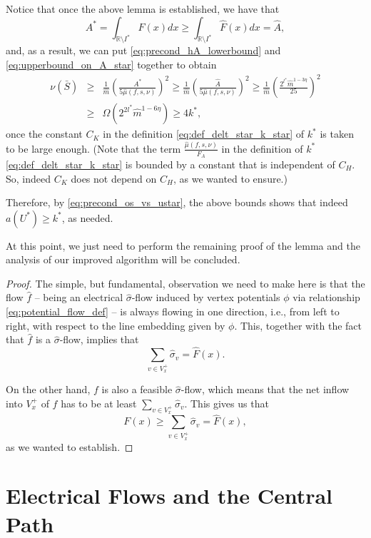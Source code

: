\documentclass[11pt, letterpaper]{article}
\newcommand{\cheavy}{C_{H}}
\newcommand{\ckstar}{C_{K}}
\newcommand{\fauxiliary}{F_{A}}
\newcommand{\bbR}{\mathbb{R}}
\newcommand{\hA}{\widehat{A}}
\newcommand{\hF}{\widehat{F}}
\newcommand{\hm}{\widehat{m}}
\newcommand{\oS}{\bar{S}}
\newcommand{\hmu}{\hat{\mu}}
\newcommand{\hsigma}{\hat{\sigma}}
\newcommand{\vphi}{\boldsymbol{\mathit{\phi}}}
\newcommand{\vnu}{\boldsymbol{\mathit{\nu}}}
\newcommand{\hvsigma}{\boldsymbol{\mathit{\hat{\sigma}}}}
\renewcommand{\aa}{\boldsymbol{\mathit{a}}}
\newcommand{\ff}{\boldsymbol{\mathit{f}}}
\newcommand{\hff}{\boldsymbol{\mathit{\hat{f}}}}
\renewcommand{\ss}{\boldsymbol{\mathit{s}}}
\begin{document}
Notice that once the above lemma is established, we have that 
\[
A^*=\int_{\bbR\setminus I^*} F(x) dx\geq \int_{\bbR\setminus I^*} \hF(x) dx = \hA,
\]
and, as a result, we can put \eqref{eq:precond_hA_lowerbound} and \eqref{eq:upperbound_on_A_star} together to obtain
\begin{eqnarray*}
\vnu(\oS) &\geq& \frac{1}{\hm}\left( \frac{A^*}{5\hmu(\ff,\ss,\vnu)}\right)^2 \geq  \frac{1}{\hm}\left( \frac{\hA}{5\hmu(\ff,\ss,\vnu)}\right)^2\geq \frac{1}{\hm}\left( \frac{2^{l^*}\hm^{1-3\eta}}{25}\right)^2\\
& \geq & \Omega(2^{2l^*} \hm^{1-6\eta}) \geq 4k^*, 
\end{eqnarray*}
once the constant $\ckstar$ in the definition \eqref{eq:def_delt_star_k_star} of $k^*$ is taken to be large enough. (Note that the term $\frac{\hmu(\ff,\ss,\vnu)}{\fauxiliary}$ in the definition of $k^*$ \eqref{eq:def_delt_star_k_star} is bounded by a constant that is independent of $\cheavy$. So, indeed $\ckstar$ does not depend on $\cheavy$, as we wanted to ensure.)

Therefore, by \eqref{eq:precond_os_vs_ustar}, the above bounds shows that indeed $\aa(U^*)\geq k^*$, as needed. 

At this point, we just need to perform the remaining proof of the lemma and the analysis of our improved algorithm will be concluded.

\begin{proof}
The simple, but fundamental, observation we need to make here is that the flow $\hff$ -- being an electrical $\hvsigma$-flow induced by vertex potentials $\vphi$ via relationship \eqref{eq:potential_flow_def} -- is always flowing in one direction, i.e., from left to right, with respect to the line embedding given by $\vphi$.  This, together with the fact that $\hff$ is a $\hvsigma$-flow, implies that
\[
\sum_{v\in V_x^+}\hsigma_v = \hF(x). 
\]

On the other hand, $\ff$ is also a feasible $\hvsigma$-flow, which means that the net inflow into $V_x^+$ of $\ff$ has to be at least $\sum_{v\in V_x^+}\hsigma_v$. This gives us that
\[
F(x)\geq \sum_{v\in V_x^+}\hsigma_v = \hF(x),
\]
as we wanted to establish.
\end{proof}

 \section{Electrical Flows and the Central Path}\label{sec:proof_main_interior_point}
\end{document}

